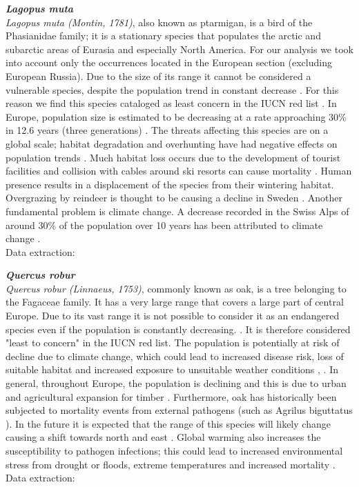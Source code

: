 \documentclass[12pt,a4paper]{article}
\begin{document}
\bigskip
{\noindent \textbf{\textit{Lagopus muta}}} 
\\
\textit{Lagopus muta (Montin, 1781)}, also known as ptarmigan, is a bird of the Phasianidae family; it is a stationary species that populates the arctic and subarctic areas of Eurasia and especially North America. For our analysis we took into account only the occurrences located in the European section (excluding European Russia).
Due to the size of its range it cannot be considered a vulnerable species, despite the population trend in constant decrease \citep{IUCN}.
For this reason we find this species cataloged as least concern in the IUCN red list \citep{IUCN}.
In Europe, population size is estimated to be decreasing at a rate approaching 30\% in 12.6 years (three generations) \citep{bird}.
The threats affecting this species are on a global scale; habitat degradation and overhunting have had negative effects on population trends \citep{mad}. Much habitat loss occurs due to the development of tourist facilities and collision with cables around ski resorts can cause mortality \citep{IUCN}.
Human presence results in a displacement of the species from their wintering habitat. Overgrazing by reindeer is thought to be causing a decline in Sweden \citep{sto}.
Another fundamental problem is climate change.
A decrease recorded in the Swiss Alps of around 30\% of the population over 10 years has been attributed to climate change \citep{de}.\\
Data extraction: \citep{pernice}

\bigskip
{\noindent \textbf{\textit{Quercus robur}}} 
\\
\textit{Quercus robur (Linnaeus, 1753)}, commonly known as oak, is a tree belonging to the Fagaceae family.
It has a very large range that covers a large part of central Europe.
Due to its vast range it is not possible to consider it as an endangered species even if the population is constantly decreasing. \citep{khe}. It is therefore considered "least to concern" in the IUCN red list. \citep{IUCN}
The population is potentially at risk of decline due to climate change, which could lead to increased disease risk, loss of suitable habitat and increased exposure to unsuitable weather conditions \citep{jon}, \citep{IUCN}.
In general, throughout Europe, the population is declining and this is due to urban and agricultural expansion for timber \citep{du}.
Furthermore, oak has historically been subjected to mortality events from external pathogens (such as Agrilus biguttatus \citep{eat}).
In the future it is expected that the range of this species will likely change causing a shift towards north and east \citep{ef}.
Global warming also increases the susceptibility to pathogen infections; this could lead to increased environmental stress from drought or floods, extreme temperatures and increased mortality \citep{jon}.\\
Data extraction:\citep{querc}
\end{document}
